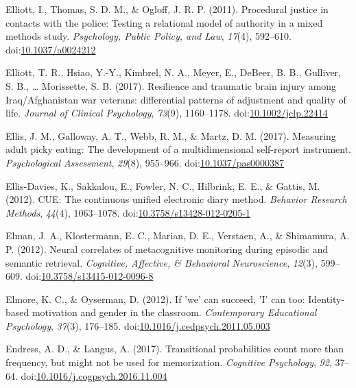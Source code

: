 \documentclass[english,man]{apa6}
\begin{document}
\hypertarget{ref-Elliott2011}{}
Elliott, I., Thomas, S. D. M., \& Ogloff, J. R. P. (2011). Procedural
justice in contacts with the police: Testing a relational model of
authority in a mixed methods study. \emph{Psychology, Public Policy, and
Law}, \emph{17}(4), 592--610.
doi:\href{https://doi.org/10.1037/a0024212}{10.1037/a0024212}

\hypertarget{ref-Elliott2017}{}
Elliott, T. R., Hsiao, Y.-Y., Kimbrel, N. A., Meyer, E., DeBeer, B. B.,
Gulliver, S. B., \ldots{} Morissette, S. B. (2017). Resilience and
traumatic brain injury among Iraq/Afghanistan war veterans: differential
patterns of adjustment and quality of life. \emph{Journal of Clinical
Psychology}, \emph{73}(9), 1160--1178.
doi:\href{https://doi.org/10.1002/jclp.22414}{10.1002/jclp.22414}

\hypertarget{ref-Ellis2017}{}
Ellis, J. M., Galloway, A. T., Webb, R. M., \& Martz, D. M. (2017).
Measuring adult picky eating: The development of a multidimensional
self-report instrument. \emph{Psychological Assessment}, \emph{29}(8),
955--966.
doi:\href{https://doi.org/10.1037/pas0000387}{10.1037/pas0000387}

\hypertarget{ref-Ellis-Davies2012}{}
Ellis-Davies, K., Sakkalou, E., Fowler, N. C., Hilbrink, E. E., \&
Gattis, M. (2012). CUE: The continuous unified electronic diary method.
\emph{Behavior Research Methods}, \emph{44}(4), 1063--1078.
doi:\href{https://doi.org/10.3758/s13428-012-0205-1}{10.3758/s13428-012-0205-1}

\hypertarget{ref-Elman2012}{}
Elman, J. A., Klostermann, E. C., Marian, D. E., Verstaen, A., \&
Shimamura, A. P. (2012). Neural correlates of metacognitive monitoring
during episodic and semantic retrieval. \emph{Cognitive, Affective, \&
Behavioral Neuroscience}, \emph{12}(3), 599--609.
doi:\href{https://doi.org/10.3758/s13415-012-0096-8}{10.3758/s13415-012-0096-8}

\hypertarget{ref-Elmore2012}{}
Elmore, K. C., \& Oyserman, D. (2012). If 'we' can succeed, 'I' can too:
Identity-based motivation and gender in the classroom.
\emph{Contemporary Educational Psychology}, \emph{37}(3), 176--185.
doi:\href{https://doi.org/10.1016/j.cedpsych.2011.05.003}{10.1016/j.cedpsych.2011.05.003}

\hypertarget{ref-Endress2017}{}
Endress, A. D., \& Langus, A. (2017). Transitional probabilities count
more than frequency, but might not be used for memorization.
\emph{Cognitive Psychology}, \emph{92}, 37--64.
doi:\href{https://doi.org/10.1016/j.cogpsych.2016.11.004}{10.1016/j.cogpsych.2016.11.004}
\end{document}
